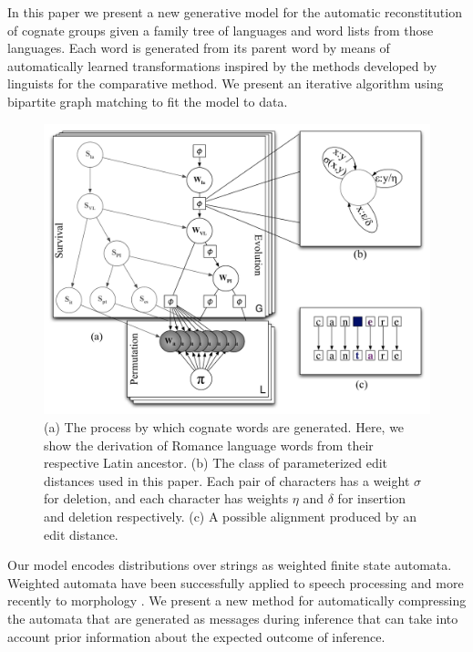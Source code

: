 \documentclass[11pt,a4paper]{article}
\begin{document}
In this paper we present a new generative model for the automatic
reconstitution of cognate groups given a family tree of languages
and word lists from those languages. Each word is generated from
its parent word by means of automatically learned transformations
inspired by the methods developed by linguists for the comparative
method. We present an iterative algorithm using bipartite graph matching
to fit the model to data.

\begin{figure}
  \centering
  \includegraphics[scale=0.4]{gmodel}
  \caption{(a) The process by which cognate words are generated.
  Here, we show the derivation of Romance language words from their
  respective Latin ancestor. (b) The class of parameterized edit
  distances used in this paper. Each pair of characters has a weight
  $\sigma$ for deletion, and each character has weights $\eta$ and
  $\delta$ for insertion and deletion respectively. (c) A possible
  alignment produced by an edit distance.}
  \label{fig:gmodel}
\end{figure}

Our model encodes distributions over strings as weighted finite
state automata. \cite{mohri09weighted} Weighted automata have been
successfully applied to speech processing \cite{Mohri96weightedautomata} and
more recently to morphology \cite{dreyer2009graphical}. We present
a new method for automatically compressing the automata that are
generated as messages during inference that can take into account
prior information about the expected outcome of inference.
\end{document}
